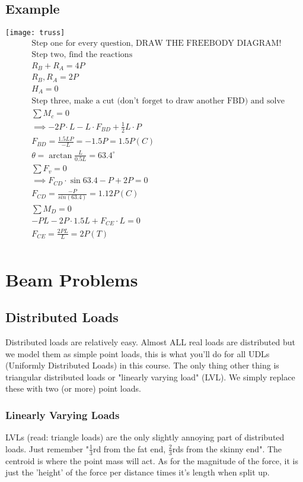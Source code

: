 \documentclass[a4paper, 12pt]{article}
\begin{document}
\begin{example*}
\subsection{Example}
\texttt{[image: truss]}
\begin{align*}
    &\text{Step one for every question, DRAW THE FREEBODY DIAGRAM!} \\
    &\text{Step two, find the reactions} \\
    &R_B + R_A = 4P \\
    &R_B, R_A = 2P \\
    &H_A = 0 \\
    &\text{Step three, make a cut (don't forget to draw another FBD) and solve} \\
    &\sum M_c = 0 \\
    &\implies -2P \cdot L - L \cdot F_{BD} + \frac{1}{2}L \cdot P \\
    &F_{BD} = \frac{1.5LP}{-L} = -1.5P = 1.5P (C) \\
    &\theta = \arctan{\frac{L}{0.5L}} = 63.4^{\circ} \\
    &\sum F_v = 0 \\
    &\implies F_{CD} \cdot \sin{63.4} - P + 2P = 0 \\
    &F_{CD} = \frac{-P}{sin(63.4)} = 1.12P (C) \\
    &\sum M_D = 0 \\
    &-PL - 2P \cdot 1.5L + F_{CE} \cdot L = 0 \\
    &F_{CE} = \frac{2PL}{L} = 2P (T) \\
\end{align*}
\end{example*}

\section{Beam Problems}
\subsection{Distributed Loads}
Distributed loads are relatively easy. Almost ALL real loads are distributed but we model them as 
simple point loads, this is what you'll do for all UDLs (Uniformly Distributed Loads) in this course. 
The only thing other thing is triangular distributed loads or "linearly varying load" (LVL). We simply 
replace these with two (or more) point loads.

\subsubsection{Linearly Varying Loads}
LVLs (read: triangle loads) are the only slightly annoying part of distributed loads. Just remember "$\frac{1}{3}$rd from 
the fat end, $\frac{2}{3}$rds from the skinny end". The centroid is where the point mass will act. As for the magnitude 
of the force, it is just the 'height' of the force per distance times it's length when split up.
\end{document}
